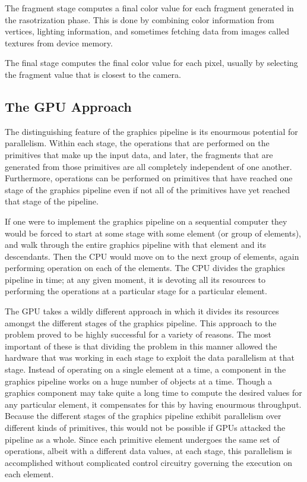 \documentclass[12pt,twoside]{reedthesis}
\begin{document}
The fragment stage computes a final color value for each fragment generated in the rasotrization phase. This is done by combining color information from vertices, lighting information, and sometimes fetching data from images called textures from device memory.

The final stage computes the final color value for each pixel, usually by selecting the fragment value that is closest to the camera.

\subsection{The GPU Approach}

The distinguishing feature of the graphics pipeline is its enourmous potential for parallelism. Within each stage, the operations that are performed on the primitives that make up the input data, and later, the fragments that are generated from those primitives are all completely independent of one another. Furthermore, operations can be performed on primitives that have reached one stage of the graphics pipeline even if not all of the primitives have yet reached that stage of the pipeline.

If one were to implement the graphics pipeline on a sequential computer they would be forced to start at some stage with some element (or group of elements), and walk through the entire graphics pipeline with that element and its descendants. Then the CPU would move on to the next group of elements, again performing operation on each of the elements. The CPU divides the graphics pipeline in time; at any given moment, it is devoting all its resources to performing the operations at a particular stage for a particular element.

The GPU takes a wildly different approach in which it divides its resources amongst the different stages of the graphics pipeline. This approach to the problem proved to be highly successful for a variety of reasons. The most important of these is that dividing the problem in this manner allowed the hardware that was working in each stage to exploit the data parallelism at that stage. Instead of operating on a single element at a time, a component in the graphics pipeline works on a huge number of objects at a time. Though a graphics component may take quite a long time to compute the desired values for any particular element, it compensates for this by having enourmous throughput. Because the different stages of the graphics pipeline exhibit parallelism over different kinds of primitives, this would not be possible if GPUs attacked the pipeline as a whole. Since each primitive element undergoes the same set of operations, albeit with a different data values, at each stage, this parallelism is accomplished without complicated control circuitry governing the execution on each element.
\end{document}
